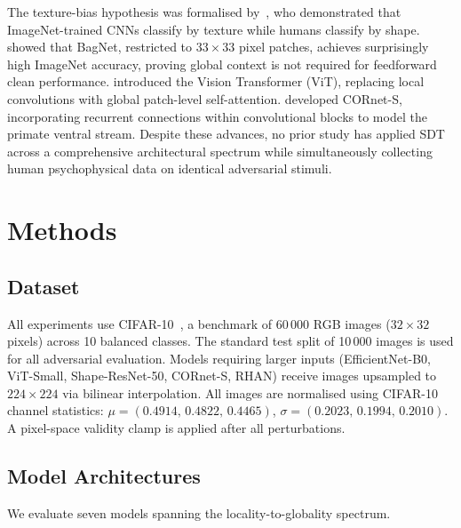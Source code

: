 \documentclass[12pt,a4paper]{article}
\begin{document}
The texture-bias hypothesis was formalised by~\citet{geirhos2019imagenet},
who demonstrated that ImageNet-trained CNNs classify by texture while humans
classify by shape.
\citet{brendel2019approximating} showed that BagNet, restricted to
$33{\times}33$ pixel patches, achieves surprisingly high ImageNet accuracy,
proving global context is not required for feedforward clean performance.
\citet{dosovitskiy2020image} introduced the Vision Transformer (ViT),
replacing local convolutions with global patch-level self-attention.
\citet{kubilius2019brain} developed CORnet-S, incorporating recurrent
connections within convolutional blocks to model the primate ventral stream.
Despite these advances, no prior study has applied SDT across a comprehensive
architectural spectrum while simultaneously collecting human psychophysical
data on identical adversarial stimuli.

\section{Methods}
\label{sec:methods}

\subsection{Dataset}
All experiments use CIFAR-10~\citep{krizhevsky2009learning},
a benchmark of 60\,000 RGB images ($32{\times}32$ pixels) across 10 balanced
classes. The standard test split of 10\,000 images is used for all
adversarial evaluation.
Models requiring larger inputs (EfficientNet-B0, ViT-Small, Shape-ResNet-50,
CORnet-S, RHAN) receive images upsampled to $224{\times}224$ via bilinear
interpolation.
All images are normalised using CIFAR-10 channel statistics:
$\mu{=}(0.4914,\,0.4822,\,0.4465)$,
$\sigma{=}(0.2023,\,0.1994,\,0.2010)$.
A pixel-space validity clamp is applied after all perturbations.

\subsection{Model Architectures}

We evaluate seven models spanning the locality-to-globality spectrum.
\end{document}
